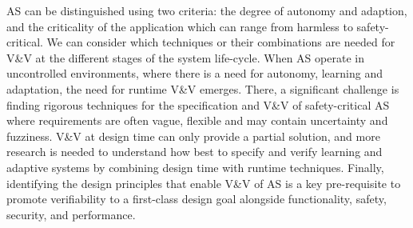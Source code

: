 \documentclass[sigconf,nonacm]{acmart}%
\begin{document}
	AS can be distinguished using two criteria: the degree of autonomy and adaption, and the criticality of the application which can range from harmless to safety-critical. 
	We can consider which techniques or their combinations are needed for V\&V at the different stages of the system life-cycle. 
	When AS operate in uncontrolled environments, where there is a need for autonomy, learning and adaptation, the need for runtime V\&V emerges. 
	There, a significant challenge is finding rigorous techniques for the specification and V\&V of safety-critical AS where requirements are often vague, flexible and may contain uncertainty and fuzziness. 
	V\&V at design time can only provide a partial solution, and more research is needed to understand how best to specify and verify learning and adaptive systems by combining design time with runtime techniques. 
	Finally, identifying the design principles that enable V\&V of AS is a key pre-requisite to promote verifiability to a first-class design goal alongside functionality, safety, security, and performance.
	
\end{document}
